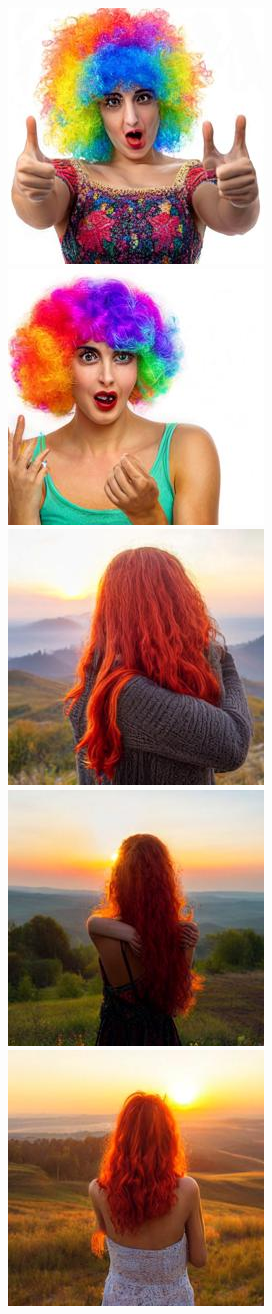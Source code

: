 \begin{figure}[h!]
\begin{subfigure}[t]{0.32\linewidth}
    	\includegraphics[width=0.32\linewidth]{figs/samples_appendix_4/adjmat_cfg_2_ode_prompt_21_image_1.jpg}\;%
    	\includegraphics[width=0.32\linewidth]{figs/samples_appendix_4/adjmat_cfg_2_ode_prompt_21_image_2.jpg}\\ 
    	\includegraphics[width=0.32\linewidth]{figs/samples_appendix_4/adjmat_cfg_2_ode_prompt_33_image_0.jpg}\;%
    	\includegraphics[width=0.32\linewidth]{figs/samples_appendix_4/adjmat_cfg_2_ode_prompt_33_image_1.jpg}\;%
    	\includegraphics[width=0.32\linewidth]{figs/samples_appendix_4/adjmat_cfg_2_ode_prompt_33_image_2.jpg}\\ 

\end{subfigure}
\end{figure}
